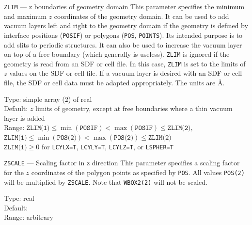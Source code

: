 \begin{keydescription}{\texttt{ZLIM} --- z boundaries of geometry domain}
%
  This parameter specifies the minimum and maximum $z$ coordinates of the
  geometry domain. It can be used to add vacuum layers left and right to
  the geometry domain if the geometry is defined by interface positions
  (\texttt{POSIF}) or polygons (\texttt{POS}, \texttt{POINTS}). Its intended 
  purpose is to add slits to periodic structures. It can also be used to
  increase the vacuum layer on top of a free boundary (which generally is
  useless). \texttt{ZLIM} is
  ignored if the geometry is read from an SDF or cell file. In this case, 
  \texttt{ZLIM} is set to the limits of $z$ values on the SDF or cell file. 
  If a vacuum layer is desired with an SDF or cell file, the SDF or cell 
  data must be adapted appropriately. The units are \AA.
  \begin{keytab}
    Type:    \> simple array (2) of real \\
    Default: \> $z$ limits of geometry, except at free boundaries where
                a thin vacuum \\
             \> layer is added  \\
    Range:   \> $\texttt{ZLIM(1)} \le \min(\texttt{POSIF}) <  
                \max(\texttt{POSIF}) \le \texttt{ZLIM(2)}$, \\
             \> $\texttt{ZLIM(1)} \le \min(\texttt{POS(2)}) <  
                \max(\texttt{POS(2)}) \le \texttt{ZLIM(2)}$ \\
             \> $\texttt{ZLIM(1)} \ge 0$ for \texttt{LCYLX=T}, 
                \texttt{LCYLY=T}, \texttt{LCYLZ=T}, or \texttt{LSPHER=T}
  \end{keytab}
\end{keydescription}

\begin{keydescription}{\texttt{ZSCALE} --- Scaling factor in z direction}
%
  This parameter specifies a scaling factor for the $z$ coordinates of the
  polygon points as specified by \texttt{POS}. All values \texttt{POS(2)}
  will be multiplied by \texttt{ZSCALE}. Note that \texttt{WBOX2(2)} will not be
  scaled.
  \begin{keytab}
    Type:    \> real \\
    Default:  \\
    Range:   \> arbitrary
  \end{keytab}
\end{keydescription}


